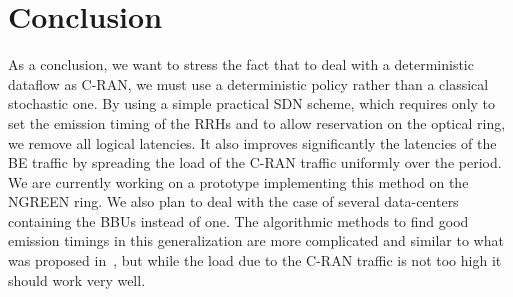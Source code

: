 \documentclass[10pt, conference, letterpaper]{IEEEtran}
\begin{document}
  
  \section*{Conclusion}
  
  As a conclusion, we want to stress the fact that to deal with a deterministic  dataflow as C-RAN, we must use a deterministic policy rather than a classical stochastic one.
  By using a simple practical SDN scheme, which requires only to set the emission timing of the RRHs and to allow reservation on the optical ring, we remove all logical latencies. It also improves significantly the latencies of the BE traffic by spreading the load of the C-RAN traffic uniformly over the period.  We are currently working on a prototype implementing this method on the NGREEN ring.
  We also plan to deal with the case of several data-centers containing the BBUs instead of one. The algorithmic methods to find good emission timings in this generalization are more complicated and similar to what was proposed in~\cite{dominique2018deterministic}, but while the load due to the C-RAN traffic is not too high it should work very well. 

      

\end{document}
